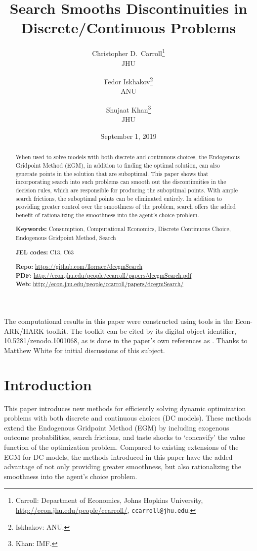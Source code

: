 \documentclass[11pt]{article}
\title{Search Smooths Discontinuities in\\ Discrete/Continuous Problems}
\author{
Christopher D.\ Carroll\thanks{Carroll: Department of Economics, Johns Hopkins University,
\url{http://econ.jhu.edu/people/ccarroll/}, \texttt{ccarroll@jhu.edu}.}\\
JHU
\and
Fedor Iskhakov\thanks{Iskhakov: ANU.}\\
ANU
\and
Shujaat Khan\thanks{Khan: IMF.}\\
JHU
}
\date{September 1, 2019}
\begin{document}
\maketitle

\begin{abstract}
When used to solve models with both discrete and continuous choices, the Endogenous
Gridpoint Method (EGM), in addition to finding the optimal solution, can also generate points
in the solution that are suboptimal. This paper shows that incorporating search into such
problems can smooth out the discontinuities in the decision rules, which are responsible for
producing the suboptimal points. With ample search frictions, the suboptimal points can be
eliminated entirely. In addition to providing greater control over the smoothness of the problem,
search offers the added benefit of rationalizing the smoothness into the agent's choice problem.

\medskip
\noindent\textbf{Keywords:} Consumption, Computational Economics, Discrete Continuous Choice,
Endogenous Gridpoint Method, Search

\noindent\textbf{JEL codes:} C13, C63

\medskip
\noindent\textbf{Repo:} \url{https://github.com/llorracc/dcegmSearch}\\
\noindent\textbf{PDF:} \url{http://econ.jhu.edu/people/ccarroll/papers/dcegmSearch.pdf}\\
\noindent\textbf{Web:} \url{http://econ.jhu.edu/people/ccarroll/papers/dcegmSearch/}
\end{abstract}

\bigskip
\noindent\footnotesize The computational results in this paper were constructed using tools in the
Econ-ARK/HARK toolkit. The toolkit can be cited by its digital object identifier,
10.5281/zenodo.1001068, as is done in the paper's own references as \citet{hark2017}.
Thanks to Matthew White for initial discussions of this subject.
\normalsize

\section{Introduction}
This paper introduces new methods for efficiently solving dynamic optimization
problems with both discrete and continuous choices (DC models). These methods
extend the Endogenous Gridpoint Method (EGM) \citep{carroll2006} by including
exogenous outcome probabilities, search frictions, and taste shocks to `concavify' the
value function of the optimization problem. Compared to existing extensions of the
EGM for DC models, the methods introduced in this paper have the added advantage
of not only providing greater smoothness, but also rationalizing the smoothness into
the agent's choice problem.
\end{document}
